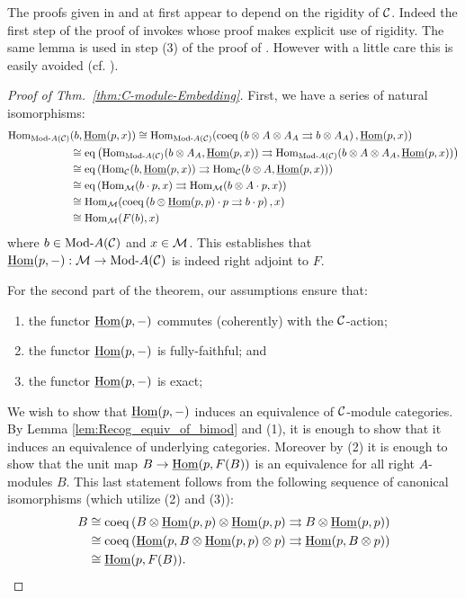 \documentclass{amsart}
\begin{document}
\noindent The proofs given in \cite{EGNO} and \cite{MR1976459} at first appear to depend on  the rigidity of $\mathcal C$. Indeed the first step of the proof of \cite[Thm 2.11.2]{EGNO} invokes \cite[lemma 2.10.4.(4)]{EGNO} whose proof makes explicit use of rigidity. The same lemma is used in step (3) of the proof of \cite[Thm 1]{MR1976459}. However with a little care this is easily avoided (cf. \cite[Rmk. 2.11.3]{EGNO}).  

\begin{proof}[Proof of Thm.~\ref{thm:C-module-Embedding}]
	First, we have a series of natural isomorphisms:
	\begin{align*}
		\Hom_{\Mod{}{A}(\cC)}&(b, \IHom(p,x))  \cong \Hom_{\Mod{}{A}(\cC)}( \coeq \left( b \otimes A \otimes A_A \rightrightarrows b \otimes A_A  \right), \IHom(p,x)) \\
		& \cong \eq \left( \Hom_{\Mod{}{A}(\cC)}(b \otimes A_A, \IHom(p,x) )  \rightrightarrows \Hom_{\Mod{}{A}(\cC)}(  b \otimes A \otimes A_A, \IHom(p,x))  \right) \\
		& \cong \eq \left( \Hom_{\cC}(b, \IHom(p,x) )  \rightrightarrows \Hom_{\cC}(  b \otimes A, \IHom(p,x))  \right) \\
		& \cong \eq \left( \Hom_{\cM}(b \cdot p, x )  \rightrightarrows \Hom_{\cM}(  b \otimes A \cdot p, x)  \right) \\
		& \cong  \Hom_{\cM}( \coeq \left( b \otimes \IHom(p,p) \cdot p \rightrightarrows b \cdot p \right), x) \\
		& \cong \Hom_{\cM}( F(b), x)
	\end{align*}  
	where $b \in \Mod{}{A}(\cC)$ and $x \in \mathcal M$. This establishes that $\IHom(p,-): \cM \to \Mod{}{A}(\cC)$ is indeed right adjoint to $F$.

For the second part of the theorem, our assumptions ensure that:
\begin{enumerate}
	\item the functor $\operatorname{\underline{Hom}}(p, -)$ commutes (coherently) with the $\mathcal C$-action;
	\item the functor $\operatorname{\underline{Hom}}(p, -)$ is fully-faithful; and
	\item the functor $\operatorname{\underline{Hom}}(p, -)$ is exact; 
\end{enumerate}
We wish to show that $\operatorname{\underline{Hom}}(p, -)$ induces an equivalence of $\mathcal C$-module categories. By Lemma \ref{lem:Recog_equiv_of_bimod} and (1), it is enough to show that it induces an equivalence of underlying categories. Moreover by (2) it is enough to show that the unit map $B \to \operatorname{\underline{Hom}}(p, F(B))$ is an equivalence for all right $A$-modules $B$. This last statement follows from the following sequence of canonical isomorphisms (which utilize (2) and (3)):
\begin{align*}
	B & \cong \operatorname{coeq} \left( B \otimes \operatorname{\underline{Hom}}(p,p) \otimes \operatorname{\underline{Hom}}(p,p) \rightrightarrows B \otimes \operatorname{\underline{Hom}}(p,p) \right)\\
	& \cong \operatorname{coeq} \left(\operatorname{\underline{Hom}}(p,B  \otimes \operatorname{\underline{Hom}}(p,p) \otimes p) \rightrightarrows \operatorname{\underline{Hom}}(p,B \otimes p) \right)\\
	& \cong \operatorname{\underline{Hom}}(p, F(B)). \qedhere
\end{align*}	
\end{proof}
\end{document}
